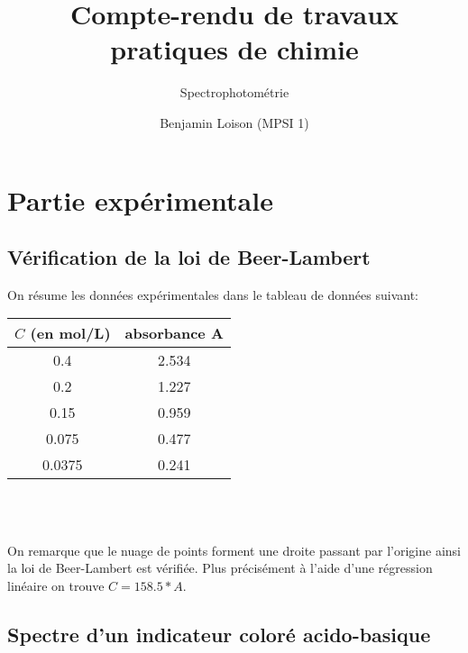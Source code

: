 \documentclass{scrartcl}
\begin{document}
	\title{\vspace{-2cm}Compte-rendu de travaux pratiques de chimie}
	\subtitle{Spectrophotométrie}
	\author{Benjamin Loison (MPSI 1)}
	\date{}
	\maketitle

  \setcounter{section}{2}
	\section{Partie expérimentale}
	
		\subsection{Vérification de la loi de Beer-Lambert}
	
			On résume les données expérimentales dans le tableau de données suivant:\\
			
			\begin{tabular}{|c|c|}
					\hline $C$ (en mol/L) & absorbance A \\
					\hline 0.4 & 2.534\\
					\hline 0.2 & 1.227\\
					\hline 0.15 & 0.959\\
					\hline 0.075 & 0.477\\
					\hline 0.0375 & 0.241\\
					\hline
				\end{tabular}\\\\
	
		
		On remarque que le nuage de points forment une droite passant par l'origine ainsi la loi de Beer-Lambert est vérifiée. Plus précisément à l'aide d'une régression linéaire on trouve $C = 158.5 * A$.
	
		\subsection{Spectre d'un indicateur coloré acido-basique}
			
\end{document}
